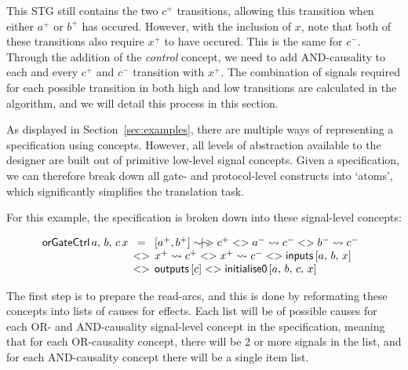 \documentclass[british,conference,compsoc]{IEEEtran}
\begin{document}
This STG still contains the two $c^{+}$ transitions, allowing this transition when either 
$a^{+}$ or $b^{+}$ has occured. However, with the inclusion of $x$, note that both
of these transitions also require $x^{+}$ to have occured. This is the same for $c^{-}$. 
Through the addition of the \emph{control} concept, we need to add AND-causality to
each and every $c^{+}$ and $c^{-}$ transition with $x^{+}$. The combination of signals
required for each possible transition in both high and low transitions are calculated in the
algorithm, and we will detail this process in this section.

As displayed in Section~\ref{sec:examples}, there are multiple ways of
representing a specification using concepts. However, all levels of
abstraction available to the designer are built out of primitive low-level
signal concepts. Given a specification, we can therefore
break down all gate- and protocol-level constructs into `atoms', which
significantly simplifies the translation task.

For this example, the specification is broken down into these signal-level concepts:

\[
\begin{array}{lcl}
\hspace{-2mm}\mathsf{orGateCtrl}\,a,\,b,\,c\,x&\hspace{-2mm}=&\hspace{-2mm}[a^{+}, b^{+}]\sim\hspace{-1.5mm}|\hspace{-1.5mm}\sim\hspace{-1.5mm}>c^{+} 
<> a^{-}\rightsquigarrow c^{-} <> b^{-}\rightsquigarrow c^{-}\\
~&\hspace{-2mm}<>&\hspace{-2mm}x^{+}\rightsquigarrow c^{+} <>
x^{+}\rightsquigarrow c^{-} <> \mathsf{inputs} \, [a,\,b,\,x] \\
~&\hspace{-2mm}<>&\hspace{-2mm}\mathsf{outputs}\,[c]<>\mathsf{initialise0}\,[a,\,b,\,c,\,x]
\end{array}
\]

\noindent The first step is to prepare the read-arcs, and this is done by
reformating these concepts into lists of causes for effects.
Each list will be of possible causes for each OR- and AND-causality signal-level
concept in the specification, meaning that for each OR-causality concept, there will
be 2 or more signals in the list, and for each AND-causality concept there will be a single
item list. 
\end{document}
